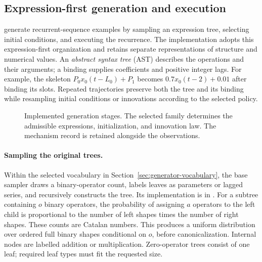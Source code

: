 \subsection{Expression-first generation and execution}
\label{sec:generator-expression-pipeline}

\citet[Section~2.1]{dascoli2022deep} generate recurrent-sequence examples by
sampling an expression tree, selecting initial conditions, and executing the
recurrence. The implementation adopts this expression-first organization and
retains separate representations of structure and numerical values.
An \emph{abstract syntax tree} (AST) describes the operations and their
arguments; a binding supplies coefficients and positive integer lags. For
example, the skeleton $P_0x_0(t-L_0)+P_1$ becomes
$0.7x_0(t-2)+0.01$ after binding its slots. Repeated trajectories preserve
both the tree and its binding while resampling initial conditions or
innovations according to the selected policy.

\begin{figure}[H]
\centering
{}
\caption{Implemented generation stages. The selected family determines the
admissible expressions, initialization, and innovation law. The mechanism
record is retained alongside the observations.}
\label{fig:implemented-generator-pipeline}
\end{figure}

\paragraph{Sampling the original trees.}
Within the selected vocabulary in Section~\ref{sec:generator-vocabulary},
the base sampler draws a binary-operator count, labels leaves as parameters
or lagged series, and recursively constructs the tree. Its implementation
is in .
For a subtree containing $o$ binary operators, the
probability of assigning $a$ operators to the left child is proportional to
the number of left shapes times the number of right shapes. These counts
are Catalan numbers. This produces a uniform distribution over ordered full
binary shapes conditional on $o$, before canonicalization. Internal nodes
are labelled addition or multiplication. Zero-operator trees consist of one
leaf; required leaf types must fit the requested size.

